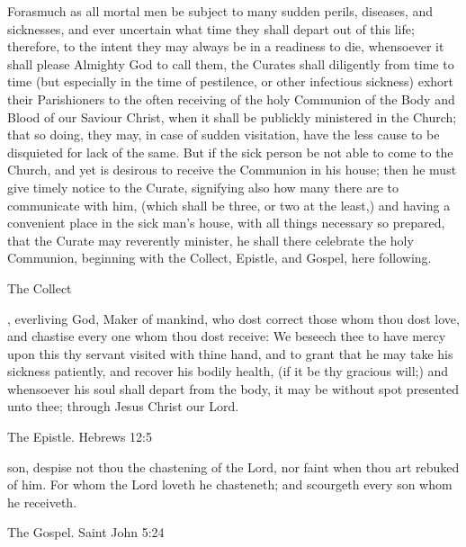 
\begin{rubric}
Forasmuch as all mortal men be subject to many sudden perils, diseases, and sicknesses, and ever uncertain what time they shall depart out of this life; therefore, to the intent they may always be in a readiness to die, whensoever it shall please Almighty God to call them, the Curates shall diligently from time to time (but especially in the time of pestilence, or other infectious sickness) exhort their Parishioners to the often receiving of the holy Communion of the Body and Blood of our Saviour Christ, when it shall be publickly ministered in the Church; that so doing, they may, in case of sudden visitation, have the less cause to be disquieted for lack of the same.
But if the sick person be not able to come to the Church, and yet is desirous to receive the Communion in his house; then he must give timely notice to the Curate, signifying also how many there are to communicate with him, (which shall be three, or two at the least,) and having a convenient place in the sick man's house, with all things necessary so prepared, that the Curate may reverently minister, he shall there celebrate the holy Communion, beginning with the Collect, Epistle, and Gospel, here following.
\end{rubric}

\begin{center}
The Collect
\end{center}

, everliving God, Maker of mankind, who dost correct those whom thou dost love, and chastise every one whom thou dost receive: We beseech thee to have mercy upon this thy servant visited with thine hand, and to grant that he may take his sickness patiently, and recover his bodily health, (if it be thy gracious will;) and whensoever his soul shall depart from the body, it may be without spot presented unto thee; through Jesus Christ our Lord.

\begin{center}
The Epistle. Hebrews 12:5
\end{center}

 son, despise not thou the chastening of the Lord, nor faint when thou art rebuked of him. For whom the Lord loveth he chasteneth; and scourgeth every son whom he receiveth.

\begin{center}
The Gospel. Saint John 5:24
\end{center}

